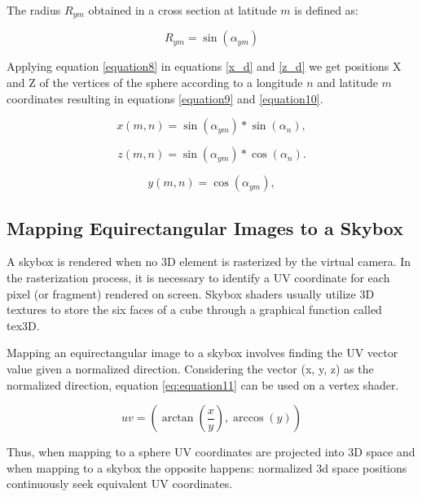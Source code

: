 \documentclass[10pt,conference]{IEEEtran}
\begin{document}
The radius $R_{ym}$ obtained in a cross section at latitude $m$ is defined as:

\begin{equation}
R_{ym} = \sin(\alpha_{ym})
\label{equation8}
\end{equation}

Applying equation \ref{equation8} in equations \ref{x_d} and \ref{z_d} we get positions X and Z of the vertices of the sphere according to a longitude $n$ and latitude $m$ coordinates resulting in equations \ref{equation9} and \ref{equation10}.

\begin{equation}
x(m,n) = \sin(\alpha_{ym}) * \sin(\alpha_n),
\label{equation9}
\end{equation}

\begin{equation}
z(m,n) = \sin(\alpha_{ym}) * \cos(\alpha_n).
\label{equation10}
\end{equation}

\begin{equation}
y(m,n) = \cos(\alpha_{ym}),
\label{equation7}
\end{equation}

\subsection{Mapping Equirectangular Images to a Skybox}

A skybox is rendered when no 3D element is rasterized by the virtual camera. In the rasterization process, it is necessary to identify a UV coordinate for each pixel (or fragment) rendered on screen. Skybox shaders usually utilize 3D textures to store the six faces of a cube through a graphical function called tex3D.

Mapping an equirectangular image to a skybox involves finding the UV vector value given a normalized direction. Considering the vector (x, y, z) as the normalized direction, equation \ref{eq:equation11} can be used on a vertex shader.

\begin{equation}
    uv = (\arctan{(\frac{x}{y})},\arccos{(y)})
    \label{eq:equation11}
\end{equation}

Thus, when mapping to a sphere UV coordinates are projected into 3D space and when mapping to a skybox the opposite happens: normalized 3d space positions continuously seek equivalent UV coordinates.
\end{document}
